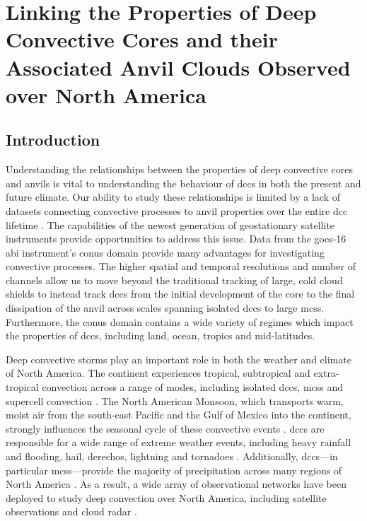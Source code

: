 \chapter{Linking the Properties of Deep Convective Cores and their Associated Anvil Clouds Observed over North America} \label{chp:lifecycle}


\section{Introduction}  %

Understanding the relationships between the properties of deep convective cores and anvils is vital to understanding the behaviour of \acrshort{dcc}s in both the present and future climate.
Our ability to study these relationships is limited by a lack of datasets connecting convective processes to anvil properties over the entire \acrshort{dcc} lifetime \citep{gasparini_opinion_2023}.
The capabilities of the newest generation of geostationary satellite instruments provide opportunities to address this issue.
Data from the \acrshort{goes}-16 \acrshort{abi} instrument's \acrshort{conus} domain provide many advantages for investigating convective processes.
The higher spatial and temporal resolutions and number of channels allow us to move beyond the traditional tracking of large, cold cloud shields to instead track \acrshort{dcc}s from the initial development of the core to the final dissipation of the anvil across scales spanning isolated \acrshort{dcc}s to large \acrshort{mcs}s.
Furthermore, the \acrshort{conus} domain contains a wide variety of regimes which impact the properties of \acrshort{dcc}s, including land, ocean, tropics and mid-latitudes.

Deep convective storms play an important role in both the weather and climate of North America.
The continent experiences tropical, subtropical and extra-tropical convection across a range of modes, including isolated \acrshort{dcc}s, \acrshort{mcs}s and supercell convection \citep{brooks_century_2019}.
The North American Monsoon, which transports warm, moist air from the south-east Pacific and the Gulf of Mexico into the continent, strongly influences the seasonal cycle of these convective events \citep{adams_north_1997, higgins_intercomparison_2001}.
\acrshort{dcc}s are responsible for a wide range of extreme weather events, including heavy rainfall and flooding, hail, derechos, lightning and tornadoes \citep{westra_future_2014, houze_chapter_2014, williams_radar_1992, bruning_theory_2013, punge_hail_2016, matsudo_severe_2011}.
Additionally, \acrshort{dcc}s---in particular \acrshort{mcs}s---provide the majority of precipitation across many regions of North America \citep{feng_spatiotemporal_2019, li_high-resolution_2021}.
As a result, a wide array of observational networks have been deployed to study deep convection over North America, including satellite observations and cloud radar \citep{brooks_century_2019}.

